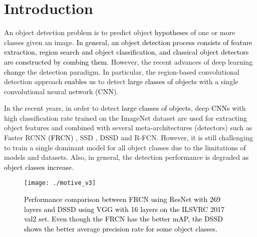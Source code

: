\documentclass[10pt,twocolumn,letterpaper]{article}
\newcommand{\RE}{\textcolor{black}}
\newcommand{\RV}{\textcolor{black}}
\begin{document}
\section{Introduction}
\label{Intro}
An object detection problem is to predict object \RV{hypotheses} of one or more classes given an image. \RV{In general, an object detection process consists of  feature extraction, region search and object classification, and classical object detectors are constructed by combing them.} However, the recent advances of deep learning \RV{change} the detection paradigm. In particular, the region-based convolutional detection approach \cite{SzegedyTE_NIPS13, Girshick15_ICCV15, SermanetEZMFL_CORR13} \RV{enables} us to detect \RV{large classes of objects} with a single convolutional neural network \RE{(CNN)}.



In the recent years, in order to detect \RV{large classes of objects},  deep \RE{CNNs} \cite{SimonyanZ14a, HeZRS_ECCV16, SzegedyIVA_AAAI17} with high classification rate trained on the ImageNet dataset \cite{ILSVRC15} are used for extracting object features and combined with several meta-architectures (\ie detectors) such as Faster RCNN \RE{(FRCN)} \cite{RenHGS15_NIPS15}, SSD \cite{LiuAESRFB_ECCV16}, DSSD \cite{FuLRTB_Corr17} and R-FCN\cite{DaiLHS_CORR16}. However, it is still challenging to train a single dominant model for all object classes due to the limitations of models and datasets. Also, in general, the detection performance is degraded \RV{as object classes increase}. 




\begin{figure}[!tbp]
\texttt{[image: ./motive\_v3]}
\caption{\RE{Performance comparison between FRCN \cite{RenHGS15_NIPS15} using ResNet \cite{HeZRS_ECCV16} with 269 layers  and DSSD \cite{HeZRS_ECCV16} using VGG \cite{SimonyanZ14a} with 16 layers on the  ILSVRC 2017 val2 set. Even though the FRCN has the better mAP, the DSSD shows the better average precision rate for some \RV{object} classes.}}
\vspace{-5pt}
\label{fig:comp_frcn_dssd}
\end{figure}
\end{document}
